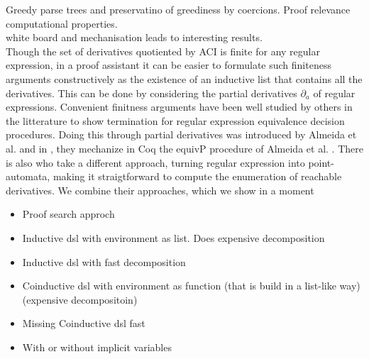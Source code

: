 \documentclass[a4paper,UKenglish,cleveref, autoref, thm-restate]{lipics-v2021}
\newcommand\mycomment[1]{}
\begin{document}
Greedy parse trees and preservatino of greediness by coercions. Proof relevance computational properties.\\
white board and mechanisation leads to interesting results.
\\
Though the set of derivatives quotiented by ACI is finite for any regular expression, in a proof assistant it can be easier to formulate such finiteness arguments constructively as the existence of an inductive list that contains all the derivatives. This can be done by considering the partial derivatives $\partial_a$ of regular expressions. Convenient finitness arguments have been well studied by others in the litterature to show termination for regular expression equivalence decision procedures. Doing this through partial derivatives was introduced by Almeida et al. \cite{AMR09} and in \cite{MPS12}, they mechanize in Coq the \textsf{equivP} procedure of Almeida et al. \mycomment{How does their termination argument work?}. There is also \cite{A12} who take a different approach, turning regular expression into point-automata, making it straigtforward to compute the enumeration of reachable derivatives. We combine their approaches, which we show in a moment
\mycomment{Two files for this, extensional and extensionalpartial which one is correct I think extensional partial, clean up code later}\\
\begin{itemize}
\item Proof search approch
\item Inductive dsl with environment as list. Does expensive decomposition
\item Inductive dsl with fast decomposition
\item Coinductive dsl with environment as function (that is build in a list-like way) (expensive decompositoin)
\item Missing Coinductive dsl fast
\item With or without implicit variables
\end{itemize}
  
\mycomment{We use a similar measure in ITP 2023 projection}
\end{document}
